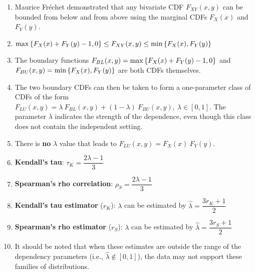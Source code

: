 \begin{enumerate}
    \item Maurice Fréchet demonstrated that any bivariate CDF $F _{X Y} (x, y)$ can be bounded from below and from above using the marginal CDFs $F_X (x)$ and $F_Y (y)$.
    \hfill \cite{statistics/book/Statistics-for-Data-Scientists/Maurits-Kaptein}

    \item
    $
        \max\left\{F_X (x) + F_Y (y) - 1, 0\right\}
        \leq
        F _{X Y} (x, y)
        \leq
        \min\left\{F_X (x), F_Y (y)\right\}
    $
    \hfill \cite{statistics/book/Statistics-for-Data-Scientists/Maurits-Kaptein}

    \item The boundary functions $F_{B L} (x, y) = \max\left\{F_X (x) + F_Y (y) - 1, 0\right\}$ and $F_{ BU} (x, y) = \min\left\{F_X (x), F_Y (y)\right\}$ are both CDFs themselves.
    \hfill \cite{statistics/book/Statistics-for-Data-Scientists/Maurits-Kaptein}

    \item The two boundary CDFs can then be taken to form a one-parameter class of CDFs of the form $F_{LU} (x, y) = \lambda\ F_{B L} (x, y) + (1 - \lambda)\ F_{BU} (x, y),\ \lambda \in [0, 1]$.
    The parameter $\lambda$ indicates the strength of the dependence, even though this class does not contain the independent setting.
    \hfill \cite{statistics/book/Statistics-for-Data-Scientists/Maurits-Kaptein}

    \item There is \textbf{no} $\lambda$ value that leads to $F_{LU} (x, y) = F_X (x)\ F_Y (y)$.
    \hfill \cite{statistics/book/Statistics-for-Data-Scientists/Maurits-Kaptein}

    \item \textbf{Kendall’s tau}: $\tau_K = \dfrac{2\lambda - 1}{3}$
    \hfill \cite{statistics/book/Statistics-for-Data-Scientists/Maurits-Kaptein}

    \item \textbf{Spearman’s rho correlation}: $\rho_S = \dfrac{2\lambda -1}{3}$
    \hfill \cite{statistics/book/Statistics-for-Data-Scientists/Maurits-Kaptein}

    \item \textbf{Kendall’s tau estimator} ($r_K$):
    $\lambda$ can be estimated by $\hat{\lambda} = \dfrac{3r_K + 1}{2}$
    \hfill \cite{statistics/book/Statistics-for-Data-Scientists/Maurits-Kaptein}

    \item \textbf{Spearman’s rho estimator} ($r_S$):
    $\lambda$ can be estimated by $\hat{\lambda} = \dfrac{3r_S + 1}{2}$
    \hfill \cite{statistics/book/Statistics-for-Data-Scientists/Maurits-Kaptein}
    
    \item[] It should be noted that when these estimates are outside the range of the dependency parameters (i.e., $\hat{\lambda} \notin [0, 1]$), the data may not support these families of distributions.
    \hfill \cite{statistics/book/Statistics-for-Data-Scientists/Maurits-Kaptein}
\end{enumerate}



